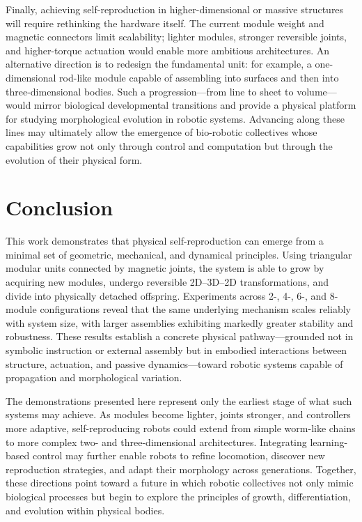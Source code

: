 \documentclass[lettersize,journal]{IEEEtran}
\begin{document}
Finally, achieving self-reproduction in higher-dimensional or massive structures will require rethinking the hardware itself. The current module weight and magnetic connectors limit scalability; lighter modules, stronger reversible joints, and higher-torque actuation would enable more ambitious architectures. An alternative direction is to redesign the fundamental unit: for example, a one-dimensional rod-like module capable of assembling into surfaces and then into three-dimensional bodies. Such a progression—from line to sheet to volume—would mirror biological developmental transitions and provide a physical platform for studying morphological evolution in robotic systems. Advancing along these lines may ultimately allow the emergence of bio-robotic collectives whose capabilities grow not only through control and computation but through the evolution of their physical form.

\section{Conclusion}
This work demonstrates that physical self-reproduction can emerge from a minimal set of geometric, mechanical, and dynamical principles. Using triangular modular units connected by magnetic joints, the system is able to grow by acquiring new modules, undergo reversible 2D–3D–2D transformations, and divide into physically detached offspring. Experiments across 2-, 4-, 6-, and 8-module configurations reveal that the same underlying mechanism scales reliably with system size, with larger assemblies exhibiting markedly greater stability and robustness. These results establish a concrete physical pathway—grounded not in symbolic instruction or external assembly but in embodied interactions between structure, actuation, and passive dynamics—toward robotic systems capable of propagation and morphological variation.

The demonstrations presented here represent only the earliest stage of what such systems may achieve. As modules become lighter, joints stronger, and controllers more adaptive, self-reproducing robots could extend from simple worm-like chains to more complex two- and three-dimensional architectures. Integrating learning-based control may further enable robots to refine locomotion, discover new reproduction strategies, and adapt their morphology across generations. Together, these directions point toward a future in which robotic collectives not only mimic biological processes but begin to explore the principles of growth, differentiation, and evolution within physical bodies.
\end{document}
